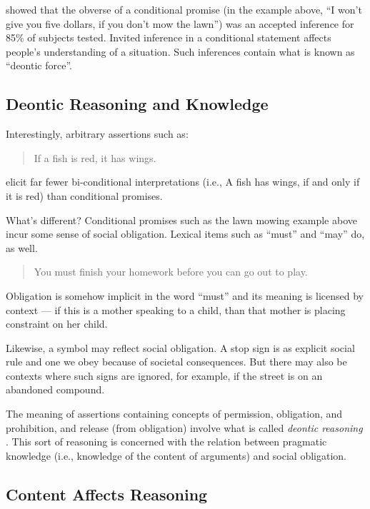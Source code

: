  \cite{Fillenbaum:1975tr}  showed that the obverse of a conditional promise (in the example above, ``I won't give you five dollars, if you don't mow the lawn'') was an accepted inference for 85\% of subjects tested. Invited inference in a conditional statement affects people's understanding of a situation. Such inferences contain what is known as ``deontic force''.

\subsection{Deontic Reasoning and Knowledge}
\label{deonticreasoningandknowledge}

Interestingly, arbitrary assertions such as:

\begin{quote}
If a fish is red, it has wings. \citep{Markovitz:1990pr}
\end{quote}

elicit far fewer bi-conditional interpretations (i.e., A fish has wings, if and only if it is red) than conditional promises. 

What's different? Conditional promises such as the lawn mowing example above incur some sense of social obligation. Lexical items such as ``must'' and ``may'' do, as well.

\begin{quote}
You must finish your homework before you can go out to play.
\end{quote}

Obligation is somehow implicit in the word ``must'' and its meaning is licensed by context --- if this is a mother speaking to a child, than that mother is placing constraint on her child. 

Likewise, a symbol may reflect social obligation. A stop sign is as explicit social rule and one we obey because of societal consequences. But there may also be contexts where such signs are ignored, for example, if the street is on an abandoned compound.

The meaning of assertions containing concepts of permission, obligation, and prohibition, and release (from obligation) involve what is called \emph{deontic reasoning}  \citep{Beller:2008de}.  This sort of reasoning is concerned with the relation between pragmatic knowledge (i.e., knowledge of the content of arguments) and social obligation. 

\subsection{Content Affects Reasoning}
\label{contentaffectsreasoning}

